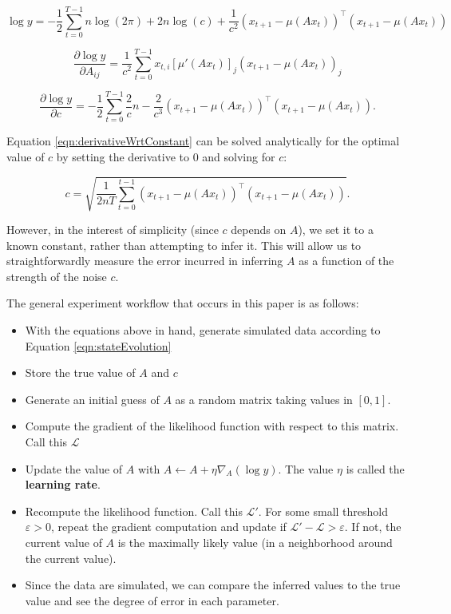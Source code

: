 \documentclass{article}
\theoremstyle{definition}
\begin{document}
\begin{equation}
    \label{eqn:simpleLikelihood}
    \log y = -\frac{1}{2} \sum_{t=0}^{T-1} n \log(2\pi) + 2n \log(c) + \frac{1}{c^2}(x_{t+1} - \mu(Ax_t))^\top (x_{t+1} - \mu(Ax_t))
\end{equation}

\begin{equation}
    \label{eqn:simpleGradAElement}
    \frac{\partial \log y}{\partial A_{ij}} = \frac{1}{c^2} \sum_{t=0}^{T-1} x_{t,i} [\mu'(Ax_t)]_j (x_{t+1} - \mu(Ax_t))_j
\end{equation}

\begin{equation}
    \label{eqn:derivativeWrtConstant}
    \frac{\partial \log y}{\partial c} = - \frac{1}{2} \sum_{t=0}^{T-1} \frac{2}{c} n - \frac{2}{c^3} (x_{t+1} - \mu(Ax_t))^\top (x_{t+1} - \mu(Ax_t)).
\end{equation}

Equation \ref{eqn:derivativeWrtConstant} can be solved analytically for the optimal value of $c$ by setting the derivative to $0$ and solving for $c$:

\begin{equation}
    c = \sqrt{\frac{1}{2nT} \sum_{t=0}^{t-1} (x_{t+1} - \mu(Ax_t))^\top (x_{t+1} - \mu(Ax_t))}.
\end{equation}

However, in the interest of simplicity (since $c$ depends on $A$), we set it to a known constant, rather than attempting to infer it. This will allow us to straightforwardly measure the error incurred in inferring $A$ as a function of the strength of the noise $c$.

The general experiment workflow that occurs in this paper is as follows:

\begin{itemize}
    \item With the equations above in hand, generate simulated data according to Equation \ref{eqn:stateEvolution}
    \item Store the true value of $A$ and $c$
    \item Generate an initial guess of $A$ as a random matrix taking values in $[0, 1]$.
    \item Compute the gradient of the likelihood function with respect to this matrix. Call this $\mathcal{L}$
    \item Update the value of $A$ with $A \leftarrow A + \eta \nabla_A (\log y)$. The value $\eta$ is called the \textbf{learning rate}.
    \item Recompute the likelihood function. Call this $\mathcal{L}'$. For some small threshold $\varepsilon > 0$, repeat the gradient computation and update if $\mathcal{L}' - \mathcal{L} > \varepsilon$. If not, the current value of $A$ is the maximally likely value (in a neighborhood around the current value). 
    \item Since the data are simulated, we can compare the inferred values to the true value and see the degree of error in each parameter. 
\end{itemize}
\end{document}
